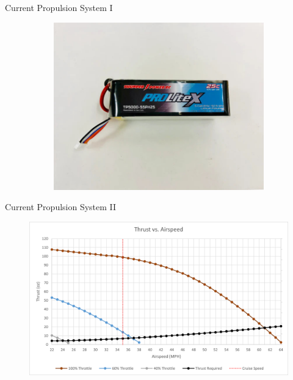 \documentclass{beamer}
\begin{document}
\begin{frame}{Current Propulsion System I}
\begin{figure}[htbp]
\begin{subfigure}{0.32\textwidth}
            \end{subfigure}
            \hfill
            \begin{subfigure}{0.32\textwidth}
                \centering
                \includegraphics[width=\textwidth]{figures/tp_battery.jpg}
            \end{subfigure}
        \end{figure}
    \end{frame}

    \begin{frame}{Current Propulsion System II}
        \begin{figure}[htpb]
            \centering
            \includegraphics[width=1\linewidth]{figures/thrust_vs_airspeed.png}
        \end{figure}
    \end{frame}
\end{document}

